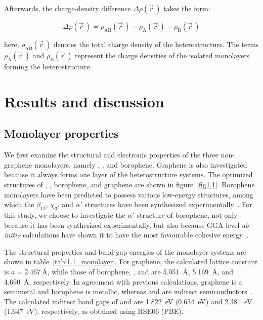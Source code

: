 Afterwards, the charge-density difference $\Delta \rho(\vec{r}\,)$ takes the form:

\begin{equation}
\Delta \rho(\vec{r}\,) =
\rho_{\mathrm{AB}}(\vec{r}\,)
- \rho_{\mathrm{A}}(\vec{r}\,)
- \rho_{\mathrm{B}}(\vec{r}\,)
\label{charge_density_difference}
\end{equation}

here, $\rho_{\mathrm{AB}}(\vec{r}\,)$ denotes the total charge density of the heterostructure.
The terms $\rho_{\mathrm{A}}(\vec{r}\,)$ and $\rho_{\mathrm{B}}(\vec{r}\,)$ represent the charge densities of the isolated monolayers forming the heterostructure.

\FloatBarrier
\section{Results and discussion}
\label{1_results}

\FloatBarrier
\subsection{Monolayer properties}

We first examine the structural and electronic properties of the three non-graphene monolayers,
namely , , and borophene.
Graphene is also investigated because it always forms one layer of the heterostructure systems.
The optimized structures of , , borophene,
and graphene are shown in figure~\ref{fig1.1}.
Borophene monolayers have been predicted to possess various low-energy structures,
among which the $\beta_{12}$, $\chi_{3}$, and $\alpha'$ structures have been synthesized experimentally~\cite{kaneti2021borophene}.
For this study, we choose to investigate the $\alpha'$ structure of borophene,
not only because it has been synthesized experimentally,
but also because GGA-level \textit{ab initio} calculations have shown it to have the most favourable cohesive energy~\cite{wu2012two}.

The structural properties and band-gap energies of the monolayer systems are shown in table~\ref{tab:1.1_monolayer}.
For graphene, the calculated lattice constant is $a = \qty{2.467}{\angstrom}$,
while those of borophene, , and  are \qty{5.051}{\angstrom}, \qty{5.169}{\angstrom}, and \qty{4.690}{\angstrom}, respectively.
In agreement with previous calculations, graphene is a semimetal and borophene is metallic,
whereas  and  are indirect semiconductors~\cite{zhang2018strain, nosheen2022first}.
The calculated indirect band gaps of  and  are \qty{1.822}{\electronvolt} (\qty{0.634}{\electronvolt}) and \qty{2.381}{\electronvolt} (\qty{1.647}{\electronvolt}), respectively, as obtained using HSE06 (PBE).

